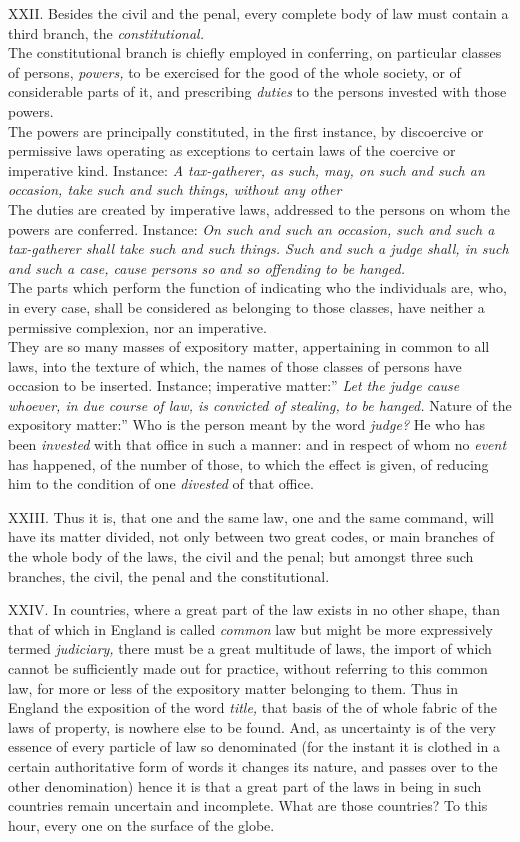 \documentclass[12pt]{report}
\begin{document}
XXII. Besides the civil and the penal, every complete body of law must
contain a third branch, the \emph{constitutional.}\\
The constitutional branch is chiefly employed in conferring, on
particular classes of persons, \emph{powers,} to be exercised for the
good of the whole society, or of considerable parts of it, and
prescribing \emph{duties} to the persons invested with those powers.\\
The powers are principally constituted, in the first instance, by
discoercive or permissive laws operating as exceptions to certain laws
of the coercive or imperative kind. Instance: \emph{A tax-gatherer, as
such, may, on such and such an occasion, take such and such things,
without any other}\\
The duties are created by imperative laws, addressed to the persons on
whom the powers are conferred. Instance: \emph{On such and such an
occasion, such and such a tax-gatherer shall take such and such things.
Such and such a judge shall, in such and such a case, cause persons so
and so offending to be hanged.}\\
The parts which perform the function of indicating who the individuals
are, who, in every case, shall be considered as belonging to those
classes, have neither a permissive complexion, nor an imperative.\\
They are so many masses of expository matter, appertaining in common to
all laws, into the texture of which, the names of those classes of
persons have occasion to be inserted. Instance; imperative
matter:'' \emph{Let the judge cause whoever, in due course of
law, is convicted of stealing, to be hanged.} Nature of the expository
matter:'' Who is the person meant by the word \emph{judge?} He
who has been \emph{invested} with that office in such a manner: and in
respect of whom no \emph{event} has happened, of the number of those, to
which the effect is given, of reducing him to the condition of one
\emph{divested} of that office.

XXIII. Thus it is, that one and the same law, one and the same command,
will have its matter divided, not only between two great codes, or main
branches of the whole body of the laws, the civil and the penal; but
amongst three such branches, the civil, the penal and the
constitutional.

XXIV. In countries, where a great part of the law exists in no other
shape, than that of which in England is called \emph{common} law but
might be more expressively termed \emph{judiciary,} there must be a
great multitude of laws, the import of which cannot be sufficiently made
out for practice, without referring to this common law, for more or less
of the expository matter belonging to them. Thus in England the
exposition of the word \emph{title,} that basis of the of whole fabric
of the laws of property, is nowhere else to be found. And, as
uncertainty is of the very essence of every particle of law so
denominated (for the instant it is clothed in a certain authoritative
form of words it changes its nature, and passes over to the other
denomination) hence it is that a great part of the laws in being in such
countries remain uncertain and incomplete. What are those countries? To
this hour, every one on the surface of the globe.
\end{document}
